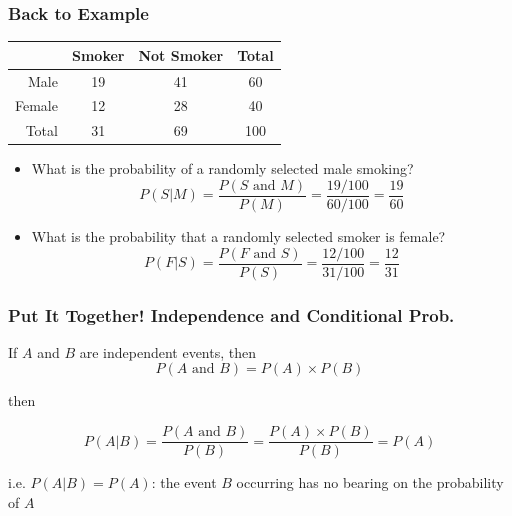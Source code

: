 \documentclass[handout]{beamer}
\begin{document}
\begin{frame}
\frametitle{Back to Example}
\begin{center}
  \begin{tabular}{r|cc|c}
	&Smoker&Not Smoker&Total\\
	\hline
Male&19&41&60\\
Female&12&28&40\\
\hline
Total&31&69&100\\
\end{tabular}
\end{center}

\begin{small}
\begin{itemize}
\item What is the probability of a randomly selected male smoking?
\[
P(S|M) = \frac{P(S \mbox{ and } M)}{P(M)} = \frac{19/100}{60/100} = \frac{19}{60}
\]
\item What is the probability that a randomly selected smoker is female?
\[
P(F|S) = \frac{P(F \mbox{ and } S)}{P(S)} = \frac{12/100}{31/100} = \frac{12}{31}
\]
\end{itemize}
\end{small}

\end{frame}


\begin{frame}
\frametitle{Put It Together!  Independence and Conditional Prob.}
If $A$ and $B$ are independent events, then
\[
P(A \mbox{ and } B) = P(A)\times P(B)
\]

\pause then

\[
P(A|B) = \frac{P(A \mbox{ and } B)}{P(B)} = \frac{P(A)\times P(B)}{P(B)} = P(A)
\]  

\vspace{0.5cm}

\pause i.e. $P(A|B) = P(A)$: the event $B$ occurring has no bearing on the probability of $A$

\end{frame}
\end{document}
